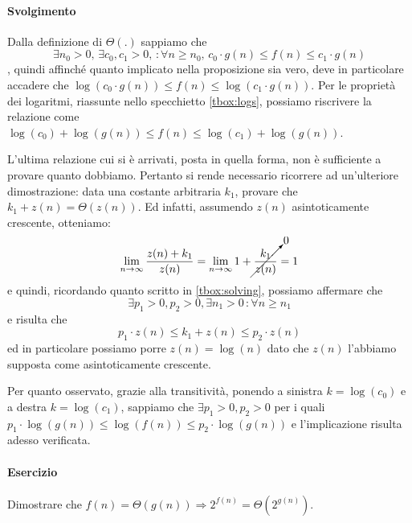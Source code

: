 \documentclass[11pt,a4paper,oneside]{article}
\begin{document}
\paragraph*{Svolgimento} Dalla definizione di $\Theta(.)$ sappiamo che $$\exists n_0 > 0,\,\exists c_0,c_1 > 0,\,:\forall n \geq n_0,\,c_0 \cdot g(n) \leq f(n) \leq c_1 \cdot g(n)$$, quindi affinché quanto implicato nella proposizione sia vero, deve in particolare accadere che $\log(c_0 \cdot g(n)) \leq f(n) \leq \log(c_1 \cdot g(n))$. Per le proprietà dei logaritmi, riassunte nello specchietto \ref{tbox:logs}, possiamo riscrivere la relazione come $\log(c_0) +\log (g(n)) \leq f(n) \leq \log(c_1) + \log(g(n))$.\\
\begin{tcolorbox}[title=Ulteriori osservazioni]
	L'ultima relazione cui si è arrivati, posta in quella forma, non è sufficiente a provare quanto dobbiamo. Pertanto si rende necessario ricorrere ad un'ulteriore dimostrazione: data una costante arbitraria $k_1$, provare che $k_1+z(n)=\Theta(z(n))$.
	Ed infatti, assumendo $z(n)$ asintoticamente crescente, otteniamo:
	$$\lim_{n\to \infty} \frac{z(n)+k_1}{z(n)} = \lim_{n\to \infty} 1+ \cancelto{0}{\frac{k_1}{z(n)}} = 1$$ e quindi, ricordando quanto scritto in \ref{tbox:solving}, possiamo affermare che $$\exists p_1 > 0,p_2>0,\exists n_1 > 0\,:\forall n \geq n_1$$ e risulta che $$p_1\cdot z(n) \leq k_1+z(n) \leq p_2 \cdot z(n)$$ ed in particolare possiamo porre $z(n) = \log(n)$ dato che $z(n)$ l'abbiamo supposta come asintoticamente crescente.
\end{tcolorbox}
Per quanto osservato, grazie alla transitività, ponendo a sinistra $k = \log(c_0)$ e a destra $k = \log(c_1)$, sappiamo che $\exists p_1 > 0,p_2>0$ per i quali $p_1\cdot \log(g(n)) \leq \log(f(n)) \leq p_2 \cdot \log(g(n))$ e l'implicazione risulta adesso verificata.
\paragraph*{Esercizio} Dimostrare che $f(n) = \Theta(g(n)) \Rightarrow 2^{f(n)} = \Theta(2^{g(n)})$.
\end{document}
